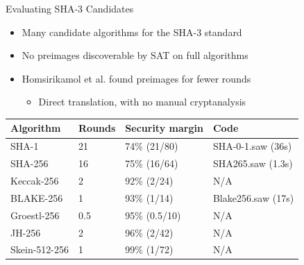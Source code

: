 \documentclass[ignorenonframetext,]{beamer}
\providecommand{\tightlist}{%
  \setlength{\itemsep}{0pt}\setlength{\parskip}{0pt}}
\newcommand{\filelink}[1]{{\alert{#1}}}
\begin{document}
\begin{frame}{Evaluating SHA-3 Candidates}

\begin{itemize}
\tightlist
\item
  Many candidate algorithms for the SHA-3 standard
\item
  No preimages discoverable by SAT on full algorithms
\item
  Homsirikamol et al. found preimages for fewer rounds \cite{homsirikamol2012sha3}

  \begin{itemize}
  \tightlist
  \item
    Direct translation, with no manual cryptanalysis
  \end{itemize}
\end{itemize}

\begin{longtable}[c]{@{}llll@{}}
\toprule
Algorithm & Rounds & Security margin & Code\tabularnewline
\midrule
\endhead
SHA-1 & 21 & 74\% (21/80) & \filelink{SHA-0-1.saw} (36s)\tabularnewline
SHA-256 & 16 & 75\% (16/64) & \filelink{SHA265.saw}
(1.3s)\tabularnewline
Keccak-256 & 2 & 92\% (2/24) & N/A\tabularnewline
BLAKE-256 & 1 & 93\% (1/14) & \filelink{Blake256.saw}
(17s)\tabularnewline
Groestl-256 & 0.5 & 95\% (0.5/10) & N/A\tabularnewline
JH-256 & 2 & 96\% (2/42) & N/A\tabularnewline
Skein-512-256 & 1 & 99\% (1/72) & N/A\tabularnewline
\bottomrule
\end{longtable}

\end{frame}
\end{document}
